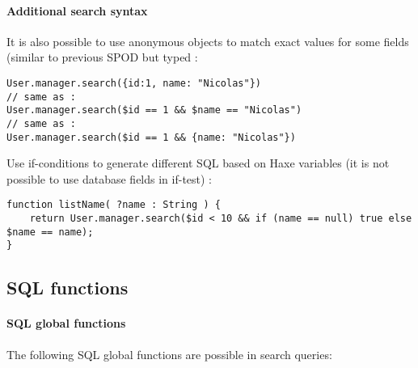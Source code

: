 \paragraph{Additional search syntax}

It is also possible to use anonymous objects to match exact values for some fields (similar to previous SPOD but typed :

\begin{lstlisting} 
User.manager.search({id:1, name: "Nicolas"})
// same as :
User.manager.search($id == 1 && $name == "Nicolas")
// same as :
User.manager.search($id == 1 && {name: "Nicolas"})
\end{lstlisting} 

Use if-conditions to generate different SQL based on Haxe variables (it is not possible to use database fields in if-test) :

\begin{lstlisting} 
function listName( ?name : String ) {
    return User.manager.search($id < 10 && if (name == null) true else $name == name);
}
\end{lstlisting} 

\subsection{SQL functions}
\label{std-spod-sql}

\paragraph{SQL global functions}
The following SQL global functions are possible in search queries:

